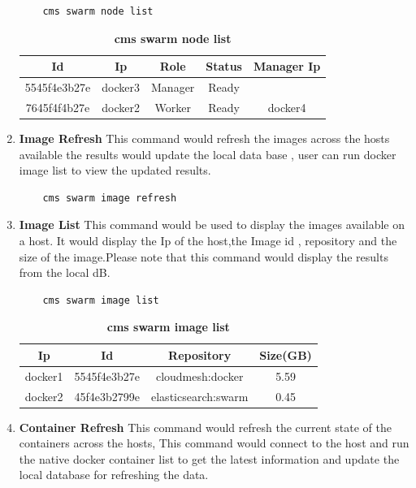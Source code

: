 \documentclass[9pt,twocolumn,twoside]{../../styles/osajnl}
\begin{document}
\begin{enumerate}
    \begin{verbatim}
    cms swarm node list
    \end{verbatim} 

     \begin{table}[htbp]
     \caption{\bf cms swarm node list }
     \begin{tabular}{ccccc}
     \hline
      Id & Ip & Role &Status & Manager Ip\\
      \hline
      5545f4e3b27e &docker3& Manager&Ready&  \\
      7645f4f4b27e &docker2& Worker&Ready&docker4  \\
     \hline
     \end{tabular}
     \label{tab:tab8}
     \end{table}
     
    \item \textbf{Image Refresh}
    This command would refresh the images across the hosts available the results would update the local data base , user can run docker image list to view the updated results.
    
    \begin{verbatim}
    cms swarm image refresh
    \end{verbatim} 
     
    \item \textbf{Image List}
    This command would be used to display the images available on a host.
    It would display the Ip of the host,the Image id , repository and the size of the image.Please note that this command would display the results from the local dB.\\
    
    \begin{verbatim}
    cms swarm image list
    \end{verbatim} 
    
    \begin{table}[htbp]
     \caption{\bf cms swarm image list }
     \begin{tabular}{cccc}
     \hline
      Ip & Id & Repository & Size(GB)\\
      \hline
      docker1 & 5545f4e3b27e & cloudmesh:docker & 5.59 \\
      docker2 & 45f4e3b2799e & elasticsearch:swarm & 0.45 \\
     \hline
     \end{tabular}
     \label{tab:tab9}
     \end{table}
     
    \item \textbf{Container Refresh}
    This command would refresh the current state of the containers across the hosts, This command would connect to the host and run the native docker container list to get the latest information and update the local database for refreshing the data. \\
    

\end{enumerate}
\end{document}
